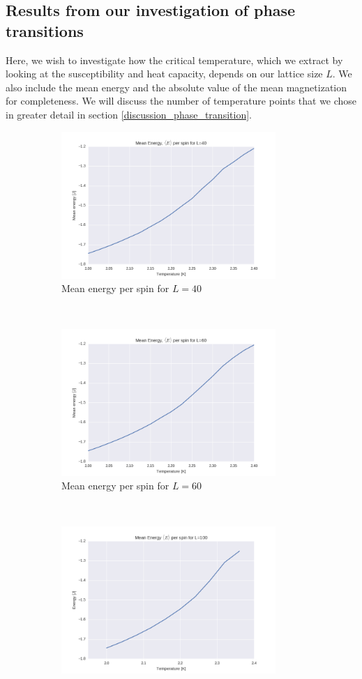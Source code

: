\documentclass[a4paper, 10pt]{article}
\begin{document}
\subsection{Results from our investigation of phase transitions}
Here, we wish to investigate how the critical temperature, which we extract by looking at the susceptibility and heat capacity, depends on our lattice size $L$. We also include the mean energy and the absolute value of the mean magnetization for completeness. We will discuss the number of temperature points that we chose in greater detail in section \ref{discussion_phase_transition}.
\begin{figure}[!ht]
    \centering
    \begin{subfigure}[H!]{0.5\textwidth}
        \centering
        \includegraphics[height=2.2in]{meanEnergyl40Ne5New.png}
        \caption{Mean energy per spin for $L=40$}
    \end{subfigure}%
    ~ 
    \begin{subfigure}[H!]{0.5\textwidth}
        \centering
        \includegraphics[height=2.2in]{meanEnergyl60Ne5New.png}
        \caption{Mean energy per spin for $L=60$}
    \end{subfigure}
        ~
     \begin{subfigure}[H!]{0.5\textwidth}
        \centering
        \includegraphics[height=2.2in]{meanEnergyl100Ne5New.png}

\end{subfigure}
\end{figure}
\end{document}
